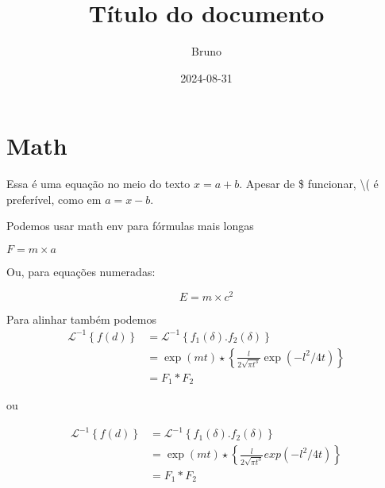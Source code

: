 \documentclass[dsc,male,12pt,a4paper]{ita}
\title{Título do documento}
\author{Bruno}
\date{2024-08-31}
\begin{document}
\frontmatter
\maketitle

\listoffigures
\listoftables

\tableofcontents

\mainmatter
\chapter{Math}

Essa é uma equação no meio do texto $x = a + b$. Apesar de \$ funcionar, \textbackslash( é preferível, como em \(a = x - b\).


Podemos usar math env para fórmulas mais longas\par
\begin{math}
	F = m \times a
\end{math}

Ou, para equações numeradas:\par

\begin{equation}
	E = m \times c^2
\end{equation}


Para alinhar também podemos %
\begin{align}
	\mathcal{L}^{-1}\left\{f(d)\right\} & = \mathcal{L}^{-1}\left\{f_1(\delta).f_2(\delta)\right\}                  \\
	                                    & = \exp(mt) \star \left\{\frac{l}{2\sqrt{\pi t^3}} \exp(-l^2/{4t})\right\} \\
	                                    & = F_1 * F_2
\end{align}

ou

\begin{equation}
	\begin{aligned}
		\mathcal{L}^{-1}\left\{f(d)\right\} & = \mathcal{L}^{-1}\left\{f_1(\delta).f_2(\delta)\right\}                 \\
		                                    & = \exp(mt) \star \left\{\frac{l}{2\sqrt{\pi t^3}} exp(-l^2/{4t})\right\} \\
		                                    & = F_1 * F_2
	\end{aligned}
\end{equation}
\end{document}
